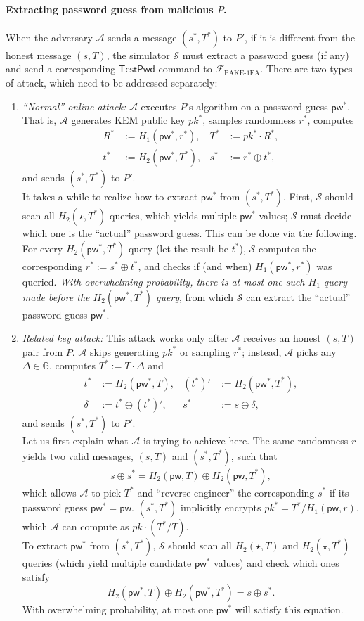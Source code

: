 \documentclass{article}
\theoremstyle{plain}
\theoremstyle{definition}
\theoremstyle{remark}
\newcommand{\group}{\mathbb{G}}
\newcommand{\adv}{\mathcal{A}}
\renewcommand{\sim}{\mathcal{S}}
\newcommand{\func}{\mathcal{F}}
\newcommand{\Fpake}{\func_\mathrm{PAKE\text{-}1EA}}
\newcommand{\pw}{\mathsf{pw}}
\newcommand{\TestPwd}{\mathsf{TestPwd}}
\begin{document}
\paragraph{Extracting password guess from malicious $P$.}
When the adversary $\adv$ sends a message $(s^*,T^*)$ to $P'$, if it is different from the honest message $(s,T)$, the simulator $\sim$ must extract a password guess (if any) and send a corresponding $\TestPwd$ command to $\Fpake$. There are two types of attack, which need to be addressed separately:
\begin{enumerate}
  \item \emph{``Normal'' online attack:} $\adv$ executes $P$'s algorithm on a password guess $\pw^*$. That is, $\adv$ generates KEM public key $pk^*$, samples randomness $r^*$, computes
      \begin{align*}
      R^* &:= H_1(\pw^*,r^*), &T^* &:= pk^* \cdot R^*, \\
      t^* &:= H_2(\pw^*,T^*), &s^* &:= r^* \oplus t^*,
      \end{align*}
      and sends $(s^*,T^*)$ to $P'$. \\
      It takes a while to realize how to extract $\pw^*$ from $(s^*,T^*)$. First, $\sim$ should scan all $H_2(\star,T^*)$ queries, which yields multiple $\pw^*$ values; $\sim$ must decide which one is the ``actual'' password guess. This can be done via the following. For every $H_2(\pw^*,T^*)$ query (let the result be $t^*$), $\sim$ computes the corresponding $r^* := s^* \oplus t^*$, and checks if (and when) $H_1(\pw^*,r^*)$ was queried. \emph{With overwhelming probability, there is at most one such $H_1$ query made before the $H_2(\pw^*,T^*)$ query}, from which $\sim$ can extract the ``actual'' password guess $\pw^*$.
  \item \emph{Related key attack:} This attack works only after $\adv$ receives an honest $(s,T)$ pair from $P$. $\adv$ skips generating $pk^*$ or sampling $r^*$; instead, $\adv$ picks any $\Delta \in \group$, computes $T^* := T \cdot \Delta$ and
      \begin{align*}
      t^* &:= H_2(\pw^*,T), &(t^*)' &:= H_2(\pw^*,T^*), \\
      \delta &:= t^* \oplus (t^*)', &s^* &:= s \oplus \delta,
      \end{align*}
      and sends $(s^*,T^*)$ to $P'$. \\
      Let us first explain what $\adv$ is trying to achieve here. The same randomness $r$ yields two valid messages, $(s,T)$ and $(s^*,T^*)$, such that
      \[
      s \oplus s^* = H_2(\pw,T) \oplus H_2(\pw,T^*),
      \]
      which allows $\adv$ to pick $T^*$ and ``reverse engineer'' the corresponding $s^*$ if its password guess $\pw^* = \pw$. $(s^*,T^*)$ implicitly encrypts $pk^* = T^*/\allowbreak H_1(\pw,r)$, which $\adv$ can compute as $pk \cdot (T^*/T)$. \\
      To extract $\pw^*$ from $(s^*,T^*)$, $\sim$ should scan all $H_2(\star,T)$ and $H_2(\star,T^*)$ queries (which yield multiple candidate $\pw^*$ values) and check which ones satisfy
      \[
      H_2(\pw^*,T) \oplus H_2(\pw^*,T^*) = s \oplus s^*.
      \]
      With overwhelming probability, at most one $\pw^*$ will satisfy this equation.
\end{enumerate}
\end{document}
